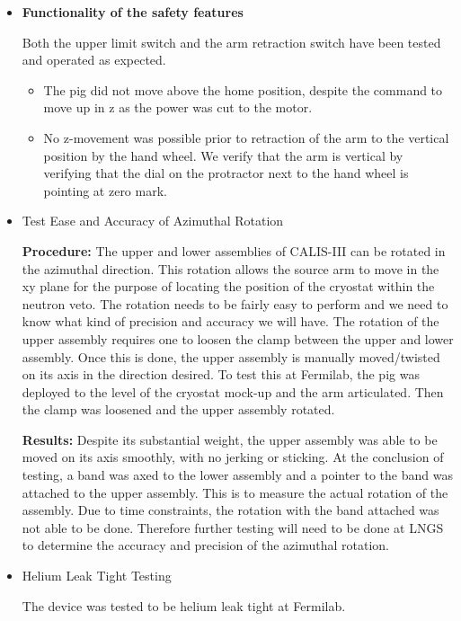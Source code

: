 \begin{itemize}
\item{\bf Functionality of the safety features}

Both the upper limit switch and the arm retraction switch have been tested and operated as expected. 
\begin{itemize}
\item
The pig did not move above the home position, despite the command to move up in z as the power was cut to the motor. 
\item
No z-movement was possible prior to retraction of the arm to the vertical position by the hand wheel. We verify that the arm is vertical by verifying that the dial on the protractor next to the hand wheel is pointing at zero mark. 
\end{itemize}
   
 \item{Test Ease and Accuracy of Azimuthal Rotation}
  
{\bf Procedure:} The upper and lower assemblies of CALIS-III can be rotated in the azimuthal direction.  This rotation allows the source arm to move in the xy plane for the purpose of locating the position of the cryostat within the neutron veto.  The rotation needs to be fairly easy to perform and we need to know what kind of precision and accuracy we will have. The rotation of the upper assembly requires one to loosen the clamp between the upper 
and
lower assembly. Once this is done, the upper assembly is manually moved/twisted on its axis in the direction
desired. To test this at Fermilab, the pig was deployed to the level of the cryostat mock-up and the arm articulated.
Then the clamp was loosened and the upper assembly rotated.

{\bf Results:} Despite its substantial weight, the upper assembly was able to be moved on its axis smoothly,
with no jerking or sticking. At the conclusion of testing, a band was axed to the lower assembly and
a pointer to the band was attached to the upper assembly. This is to measure the actual rotation of the
assembly. Due to time constraints, the rotation with the band attached was not able to be done. Therefore
further testing will need to be done at LNGS to determine the accuracy and precision of the azimuthal
rotation.  
 
\item{Helium Leak Tight Testing}
   
The device was tested to be helium leak tight at Fermilab.  
 
\end{itemize}

